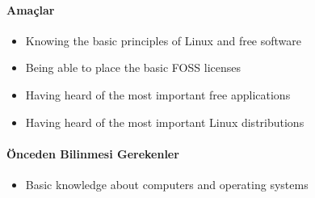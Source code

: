 \documentclass[10pt,a5paper]{book}
\begin{document}
\paragraph{Amaçlar}{
\begin{itemize}
 \item Knowing the basic principles of Linux and free software
 \item Being able to place the basic FOSS licenses
 \item Having heard of the most important free applications
 \item Having heard of the most important Linux distributions
 \end{itemize}}
 
\paragraph{Önceden Bilinmesi Gerekenler}
\begin{itemize}
 \item Basic knowledge about computers and operating systems
 \end{itemize}
\end{document}
